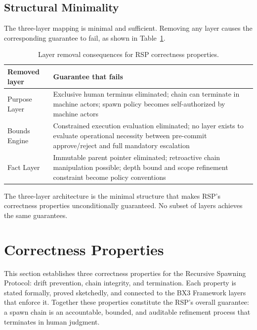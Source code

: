 \subsection{Structural Minimality}
\label{sec:rs-minimality}

The three-layer mapping is minimal and sufficient. Removing any layer causes the corresponding guarantee to fail, as shown in Table~\ref{tab:rs-layer-minimality}.

\begin{table}[h]
\centering
\begin{tabular}{p{3.2cm} p{4.8cm}}
\toprule
\textbf{Removed layer} & \textbf{Guarantee that fails} \\
\midrule
Purpose Layer & Exclusive human terminus eliminated; chain can terminate in machine actors; spawn policy becomes self-authorized by machine actors \\
Bounds Engine & Constrained execution evaluation eliminated; no layer exists to evaluate operational necessity between pre-commit approve/reject and full mandatory escalation \\
Fact Layer & Immutable parent pointer eliminated; retroactive chain manipulation possible; depth bound and scope refinement constraint become policy conventions \\
\bottomrule
\end{tabular}
\caption{Layer removal consequences for RSP correctness properties.}
\label{tab:rs-layer-minimality}
\end{table}

The three-layer architecture is the minimal structure that makes RSP's correctness properties unconditionally guaranteed. No subset of layers achieves the same guarantees.

\section{Correctness Properties}
\label{sec:rs-correctness}

This section establishes three correctness properties for the Recursive Spawning Protocol: drift prevention, chain integrity, and termination. Each property is stated formally, proved sketchedly, and connected to the BX3 Framework layers that enforce it. Together these properties constitute the RSP's overall guarantee: a spawn chain is an accountable, bounded, and auditable refinement process that terminates in human judgment.

